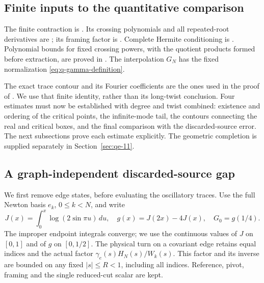 \subsection{Finite inputs to the quantitative comparison}\label{sec:qe-2}

The finite contraction is \cite[Theorem~7.1]{MeridianTangles}.
Its crossing polynomials and all repeated-root derivatives are
\cite[Proposition~6.1]{MeridianTangles}; its framing factor is
\cite[Proposition~8.1]{MeridianTangles}. Complete Hermite
conditioning is \cite[Lemma~2.1]{Bounds}. Polynomial bounds for
fixed crossing powers, with the quotient products formed before
extraction, are proved in \cite[Lemma~2.1]{MovingMeridianSources}.
The interpolation $G_N$ has the fixed normalization
\eqref{eq:q-gamma-definition}.

The exact trace contour and its Fourier coefficients are the ones
used in the proof of \cite[Theorem~1.2]{MovingMeridianSources}.
We use that finite identity, rather than its long-twist conclusion.
Four estimates must now be established with degree and twist
combined: existence and ordering of the critical points, the
infinite-mode tail, the contours connecting the real and critical
boxes, and the final comparison with the discarded-source error.
The next subsections prove each estimate explicitly. The geometric
completion is supplied separately in Section~\ref{sec:qe-11}.

\subsection{A graph-independent discarded-source gap}\label{sec:qe-3}

We first remove edge states, before evaluating the oscillatory traces.
Use the full Newton basis \(e_k\), \(0\le k<N\), and write
\begin{equation}
J(x)=\int_0^x\log(2\sin\pi u)\,du,\quad
 g(x)=J(2x)-4J(x),\quad G_0=g(1/4).
\label{eq:qe-3}
\end{equation}
The improper endpoint integrals converge; we use the continuous
values of $J$ on $[0,1]$ and of $g$ on $[0,1/2]$.
The physical turn on a covariant edge retains equal indices and the actual factor \(\gamma_e(s)H_N(s)/W_k(s)\). This factor and its inverse are bounded on any fixed \(|s|\le R<1\), including all indices. Reference, pivot, framing and the single reduced-cut scalar are kept.

